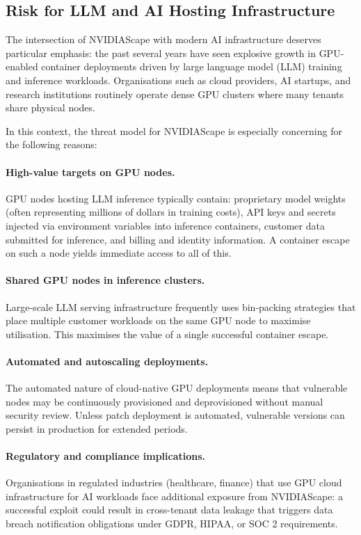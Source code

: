 \subsection{Risk for LLM and AI Hosting Infrastructure}
\label{subsec:ai-risk}

The intersection of NVIDIAScape with modern AI infrastructure deserves particular emphasis: the past several years have seen explosive growth in GPU-enabled container deployments driven by large language model (LLM) training and inference workloads. Organisations such as cloud providers, AI startups, and research institutions routinely operate dense GPU clusters where many tenants share physical nodes.
 
In this context, the threat model for NVIDIAScape is especially concerning for the following reasons:
 
\paragraph{High-value targets on GPU nodes.} GPU nodes hosting LLM inference typically contain: proprietary model weights (often representing millions of dollars in training costs), API keys and secrets injected via environment variables into inference containers, customer data submitted for inference, and billing and identity information. A container escape on such a node yields immediate access to all of this.
 
\paragraph{Shared GPU nodes in inference clusters.} Large-scale LLM serving infrastructure frequently uses bin-packing strategies that place multiple customer workloads on the same GPU node to maximise utilisation. This maximises the value of a single successful container escape.
 
\paragraph{Automated and autoscaling deployments.} The automated nature of cloud-native GPU deployments means that vulnerable nodes may be continuously provisioned and deprovisioned without manual security review. Unless patch deployment is automated, vulnerable versions can persist in production for extended periods.
 
\paragraph{Regulatory and compliance implications.} Organisations in regulated industries (healthcare, finance) that use GPU cloud infrastructure for AI workloads face additional exposure from NVIDIAScape: a successful exploit could result in cross-tenant data leakage that triggers data breach notification obligations under GDPR, HIPAA, or SOC 2 requirements.